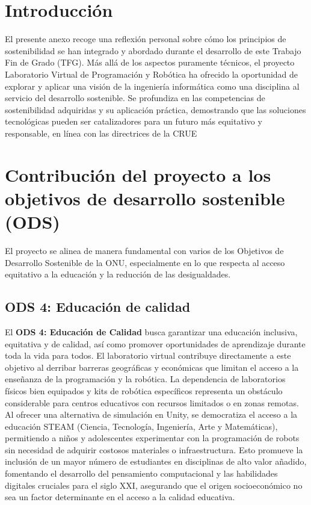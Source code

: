 
\section{Introducción}
El presente anexo recoge una reflexión personal sobre cómo los principios de sostenibilidad se han integrado y abordado durante el desarrollo de este Trabajo Fin de Grado (TFG). Más allá de los aspectos puramente técnicos, el proyecto Laboratorio Virtual de Programación y Robótica ha ofrecido la oportunidad de explorar y aplicar una visión de la ingeniería informática como una disciplina al servicio del desarrollo sostenible. Se profundiza en las competencias de sostenibilidad adquiridas y su aplicación práctica, demostrando que las soluciones tecnológicas pueden ser catalizadores para un futuro más equitativo y responsable, en línea con las directrices de la CRUE \cite{CRUE2012_Directrices}
\section{Contribución del proyecto a los objetivos de desarrollo sostenible (ODS)}
El proyecto se alinea de manera fundamental con varios de los Objetivos de Desarrollo Sostenible de la ONU, especialmente en lo que respecta al acceso equitativo a la educación y la reducción de las desigualdades.
\subsection{ODS 4: Educación de calidad}
El \textbf{ODS 4: Educación de Calidad} busca garantizar una educación inclusiva, equitativa y de calidad, así como promover oportunidades de aprendizaje durante toda la vida para todos. El laboratorio virtual contribuye directamente a este objetivo al derribar barreras geográficas y económicas que limitan el acceso a la enseñanza de la programación y la robótica. La dependencia de laboratorios físicos bien equipados y kits de robótica específicos representa un obstáculo considerable para centros educativos con recursos limitados o en zonas remotas. Al ofrecer una alternativa de simulación en Unity, se democratiza el acceso a la educación STEAM (Ciencia, Tecnología, Ingeniería, Arte y Matemáticas), permitiendo a niños y adolescentes experimentar con la programación de robots sin necesidad de adquirir costosos materiales o infraestructura. Esto promueve la inclusión de un mayor número de estudiantes en disciplinas de alto valor añadido, fomentando el desarrollo del pensamiento computacional y las habilidades digitales cruciales para el siglo XXI, asegurando que el origen socioeconómico no sea un factor determinante en el acceso a la calidad educativa.
